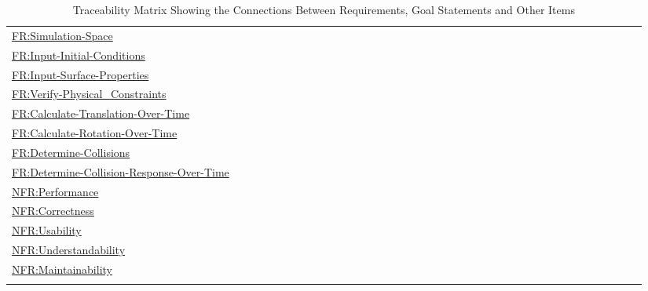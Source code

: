 \documentclass[12pt]{article}
\begin{document}
\begin{longtable}{l l l l l l l l l l l l l l l l l l l l l l l l l l l l l l l l l l l l l l}
\\
\hyperref[simSpace]{FR:Simulation-Space} &  &  &  &  &  &  &  &  &  &  &  &  &  &  &  &  &  &  &  &  &  &  &  &  &  &  &  &  &  &  &  &  &  &  &  &  & 
\\
\hyperref[inputInitialConds]{FR:Input-Initial-Conditions} &  &  &  &  &  &  &  &  &  &  &  &  &  &  &  &  &  &  &  &  &  &  &  &  &  &  &  &  &  &  &  &  &  &  &  &  & 
\\
\hyperref[inputSurfaceProps]{FR:Input-Surface-Properties} &  &  &  &  &  &  &  &  &  &  &  &  &  &  &  &  &  &  &  &  &  &  &  &  &  &  &  &  &  &  &  &  &  &  &  &  & 
\\
\hyperref[verifyPhysCons]{FR:Verify-Physical\_Constraints} &  &  &  &  &  &  &  &  &  &  &  &  &  &  &  &  &  &  &  &  &  &  &  &  &  &  &  &  &  &  &  &  &  &  &  &  & 
\\
\hyperref[calcTransOverTime]{FR:Calculate-Translation-Over-Time} &  &  &  &  &  &  &  &  &  &  &  &  &  &  &  &  &  &  &  &  &  &  &  &  &  &  &  &  &  &  &  &  &  &  &  &  & 
\\
\hyperref[calcRotOverTime]{FR:Calculate-Rotation-Over-Time} &  &  &  &  &  &  &  &  &  &  &  &  &  &  &  &  &  &  &  &  &  &  &  &  &  &  &  &  &  &  &  &  &  &  &  &  & 
\\
\hyperref[deterColls]{FR:Determine-Collisions} &  &  &  &  &  &  &  &  &  &  &  &  &  &  &  &  &  &  &  &  &  &  &  &  &  &  &  &  &  &  &  &  &  &  &  &  & 
\\
\hyperref[deterCollRespOverTime]{FR:Determine-Collision-Response-Over-Time} &  &  &  &  &  &  &  &  &  &  &  &  &  &  &  &  &  &  &  &  &  &  &  &  &  &  &  &  &  &  &  &  &  &  &  &  & 
\\
\hyperref[performance]{NFR:Performance} &  &  &  &  &  &  &  &  &  &  &  &  &  &  &  &  &  &  &  &  &  &  &  &  &  &  &  &  &  &  &  &  &  &  &  &  & 
\\
\hyperref[correctness]{NFR:Correctness} &  &  &  &  &  &  &  &  &  &  &  &  &  &  &  &  &  &  &  &  &  &  &  &  &  &  &  &  &  &  &  &  &  &  &  &  & 
\\
\hyperref[usability]{NFR:Usability} &  &  &  &  &  &  &  &  &  &  &  &  &  &  &  &  &  &  &  &  &  &  &  &  &  &  &  &  &  &  &  &  &  &  &  &  & 
\\
\hyperref[understandability]{NFR:Understandability} &  &  &  &  &  &  &  &  &  &  &  &  &  &  &  &  &  &  &  &  &  &  &  &  &  &  &  &  &  &  &  &  &  &  &  &  & 
\\
\hyperref[maintainability]{NFR:Maintainability} &  &  &  &  &  &  &  &  &  &  &  &  &  &  &  &  &  &  &  &  &  &  &  &  &  &  &  &  &  &  &  &  &  &  &  &  & 
\\
\bottomrule
\caption{Traceability Matrix Showing the Connections Between Requirements, Goal Statements and Other Items}
\label{Table:TraceMatAllvsR}
\end{longtable}
\end{document}
